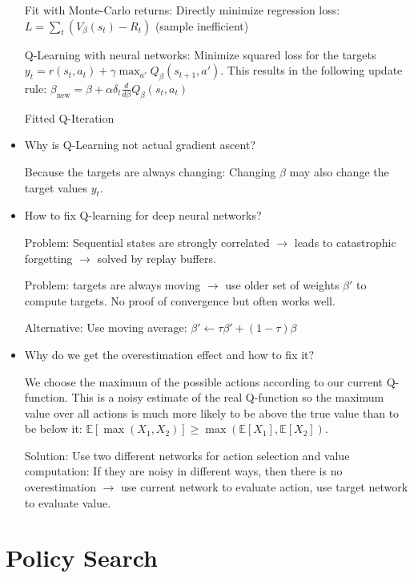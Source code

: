 \documentclass[11pt]{scrartcl}
\begin{document}
\begin{itemize}
    Fit with Monte-Carlo returns: Directly minimize regression loss: $L = \sum_t(V_\beta(s_t) - R_t)$ (sample inefficient)
    
    Q-Learning with neural networks: Minimize squared loss for the targets $y_t = r(s_t,a_t) + \gamma\max_{a'}Q_\beta(s_{t+1},a')$.
    This results in the following update rule: $\beta_\mathrm{new} = \beta + \alpha\delta_t\frac{d}{d\beta}Q_\beta(s_t,a_t)$
    
    Fitted Q-Iteration

    \item Why is Q-Learning not actual gradient ascent?
    
    Because the targets are always changing: Changing $\beta$ may also change the target values $y_t$.

    \item How to fix Q-learning for deep neural networks?
    
    Problem: Sequential states are strongly correlated $\rightarrow$ leads to catastrophic
    forgetting $\rightarrow$ solved by replay buffers.
    
    Problem: targets are always moving $\rightarrow$ use older set of weights $\beta'$ to 
    compute targets. No proof of convergence but often works well.

    Alternative: Use moving average: $\beta' \leftarrow \tau\beta' + (1 - \tau)\beta$

    \item Why do we get the overestimation effect and how to fix it?
    
    We choose the maximum of the possible actions according to our current Q-function. 
    This is a noisy estimate of the real Q-function so the maximum value over all actions is 
    much more likely to be above the true value than to be below it:
    $\mathbb{E}[\max(X_1,X_2)] \geq \max(\mathbb{E}[X_1],\mathbb{E}[X_2])$.

    Solution: Use two different networks for action selection and value computation: If they are
    noisy in different ways, then there is no overestimation $\rightarrow$ use current network
    to evaluate action, use target network to evaluate value.
\end{itemize}


\section{Policy Search}
\end{document}
